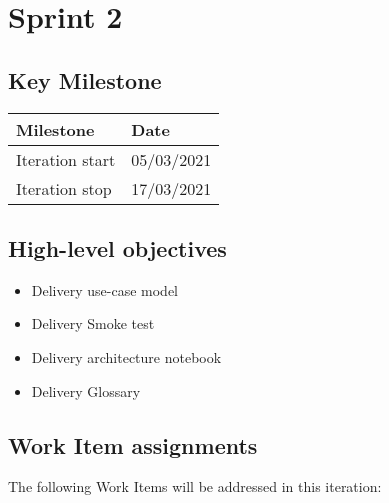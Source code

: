 \clearpage
\section{Sprint 2}

\subsection*{Key Milestone}



\noindent\begin{tabular}{|l|l|}
\hline
Milestone       & Date \\ \hline
Iteration start & 05/03/2021 \\ \hline
Iteration stop  & 17/03/2021 \\ \hline
\end{tabular}


\subsection*{High-level objectives}


\begin{itemize}
	\item	Delivery use-case model
	\item	Delivery Smoke test
	\item	Delivery architecture notebook
	\item 	Delivery Glossary
\end{itemize}

\subsection*{Work Item assignments}


The following Work Items will be addressed in this iteration:

